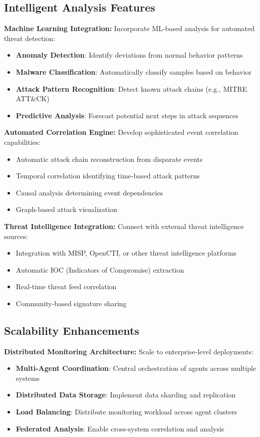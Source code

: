 \subsection{Intelligent Analysis Features}

\textbf{Machine Learning Integration:}
Incorporate ML-based analysis for automated threat detection:
\begin{itemize}
    \item \textbf{Anomaly Detection}: Identify deviations from normal behavior patterns
    \item \textbf{Malware Classification}: Automatically classify samples based on behavior
    \item \textbf{Attack Pattern Recognition}: Detect known attack chains (e.g., MITRE ATT\&CK)
    \item \textbf{Predictive Analysis}: Forecast potential next steps in attack sequences
\end{itemize}

\textbf{Automated Correlation Engine:}
Develop sophisticated event correlation capabilities:
\begin{itemize}
    \item Automatic attack chain reconstruction from disparate events
    \item Temporal correlation identifying time-based attack patterns
    \item Causal analysis determining event dependencies
    \item Graph-based attack visualization
\end{itemize}

\textbf{Threat Intelligence Integration:}
Connect with external threat intelligence sources:
\begin{itemize}
    \item Integration with MISP, OpenCTI, or other threat intelligence platforms
    \item Automatic IOC (Indicators of Compromise) extraction
    \item Real-time threat feed correlation
    \item Community-based signature sharing
\end{itemize}

\subsection{Scalability Enhancements}

\textbf{Distributed Monitoring Architecture:}
Scale to enterprise-level deployments:
\begin{itemize}
    \item \textbf{Multi-Agent Coordination}: Central orchestration of agents across multiple systems
    \item \textbf{Distributed Data Storage}: Implement data sharding and replication
    \item \textbf{Load Balancing}: Distribute monitoring workload across agent clusters
    \item \textbf{Federated Analysis}: Enable cross-system correlation and analysis
\end{itemize}

